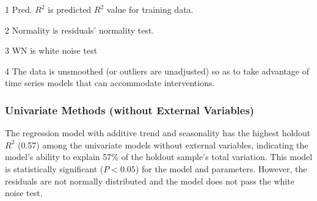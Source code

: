 \begin{table}[htbp]
\begin{threeparttable}
\begin{tabular}{C{2cm}p{0.5cm}m{5cm}C{0.8cm}C{1.5cm}ccc}
		\end{tabular}%
		\begin{tablenotes}
			\item[1] Pred. $R^2$ is predicted $R^2$ value for training data.
			\item[2] Normality is residuals' normality test.
			\item[3] WN is white noise test
			\item[4] The data is unsmoothed (or outliers are unadjusted) so as to take advantage of time series models that can accommodate interventions.
		\end{tablenotes}
	\end{threeparttable}
	\label{tab:1}%
\end{table}%

\subsubsection{Univariate Methods (without External Variables)}
The regression model with additive trend and seasonality has the highest holdout $R^2$ (0.57) among the univariate models without external variables, indicating the model's ability to explain 57\% of the holdout sample's total variation. This model is statistically significant ($P<0.05$) for the model and parameters. However, the residuals are not normally distributed and the model does not pass the white noise test. 

